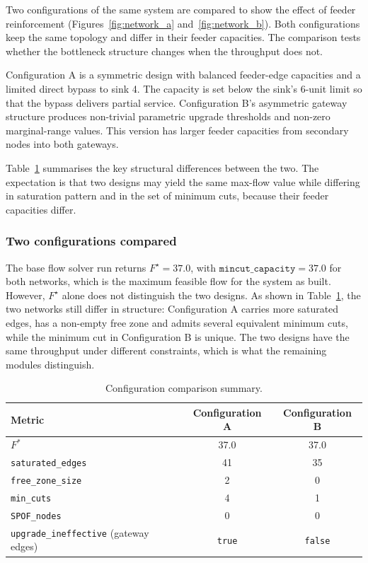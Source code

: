 \documentclass[12pt]{report}
\begin{document}
Two configurations of the same system are compared to show the effect of feeder reinforcement (Figures~\ref{fig:network_a} and~\ref{fig:network_b}). 
Both configurations keep the same topology and differ in their feeder capacities. The comparison tests whether the bottleneck structure changes when the throughput does not. 

Configuration A is a symmetric design with balanced feeder-edge capacities and a limited direct bypass to sink 4. The capacity is set below the sink's 6-unit limit so that the bypass delivers partial service. Configuration B's asymmetric gateway structure produces non-trivial parametric upgrade thresholds and non-zero marginal-range values. This version has larger feeder capacities from secondary nodes into both gateways.
 
Table~\ref{tab:config_comparison} summarises the key structural differences between the two. The expectation is that two designs may yield the same max-flow value while differing in saturation pattern and in the set of minimum cuts, because their feeder capacities differ.



\subsubsection{Two configurations compared}

The base flow solver run returns $F^\star = 37.0$, with $\texttt{mincut\_capacity} = 37.0$ for both networks, which is the maximum feasible flow for the system as built. However, $F^\star$ alone does not distinguish the two designs. As shown in Table~\ref{tab:config_comparison}, the two networks still differ in structure: Configuration A carries more saturated edges, has a non-empty free zone and admits several equivalent minimum cuts, while the minimum cut in Configuration B is unique. The two designs have the same throughput under different constraints, which is what the remaining modules distinguish.

\begin{table}[htbp]
\centering
\caption{Configuration comparison summary.}
\label{tab:config_comparison}
\begin{tabular}{lcc}
\toprule
Metric & Configuration A & Configuration B \\
\midrule
$F^*$                                        & 37.0           & 37.0           \\
\texttt{saturated\_edges}                    & 41             & 35             \\
\texttt{free\_zone\_size}                    & 2              & 0              \\
\texttt{min\_cuts}                           & 4              & 1              \\
\texttt{SPOF\_nodes}                         & 0              & 0              \\
\texttt{upgrade\_ineffective} (gateway edges) & \texttt{true} & \texttt{false} \\
\bottomrule
\end{tabular}
\end{table}
\end{document}
